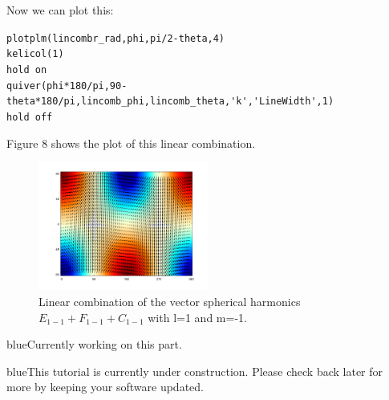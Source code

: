 \documentclass[11pt]{article}
\newcommand{\TAG}{\begin{color}{blue}This tutorial is currently under construction. Please check back later for more by keeping your software updated.\end{color}}
\newcommand{\HERE}{\begin{color}{blue}Currently working on this part.\end{color}}
\begin{document}
Now we can plot this:

\verb|plotplm(lincombr_rad,phi,pi/2-theta,4)|\\
\verb|kelicol(1)|\\
\verb|hold on|\\
\verb|quiver(phi*180/pi,90-theta*180/pi,lincomb_phi,lincomb_theta,'k','LineWidth',1)|\\
\verb|hold off|

Figure 8 shows the plot of this linear combination.
\begin{figure}[H]
  \centering
  \includegraphics[width=0.5\textwidth]{figures_Rep2/lincombEFC_quiver.png}  
  \caption{Linear combination of the vector spherical harmonics $E_{1-1}+F_{1-1}+C_{1-1}$ with l=1 and m=-1.}
\label{EFCcomb_quiver}
\end{figure}




\HERE

\TAG
\end{document}
